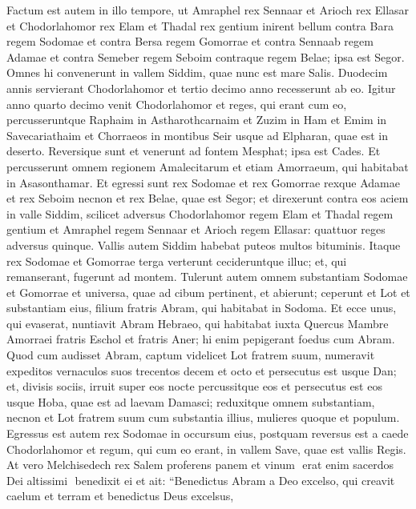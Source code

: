 \begin{biblechapter}
\begin{biblechapter}
\begin{biblechapter}
\begin{biblechapter}
\begin{biblechapter}
\begin{biblechapter}
\begin{biblechapter}
\begin{biblechapter}
\begin{biblechapter}
\begin{biblechapter}
\begin{biblechapter}
\begin{biblechapter}
\begin{biblechapter}
\begin{biblechapter}
\verse Factum est autem in illo tempore, ut Amraphel rex Sennaar et Arioch rex Ellasar et Chodorlahomor rex Elam et Thadal rex gentium 
\verse inirent bellum contra Bara regem Sodomae et contra Bersa regem Gomorrae et contra Sennaab regem Adamae et contra Semeber regem Seboim contraque regem Belae; ipsa est Segor.
 \verse Omnes hi convenerunt in vallem Siddim, quae nunc est mare Salis. 
\verse Duodecim annis servierant Chodorlahomor et tertio decimo anno recesserunt ab eo. 
\verse Igitur anno quarto decimo venit Chodorlahomor et reges, qui erant cum eo, percusseruntque Raphaim in Astharothcarnaim et Zuzim in Ham et Emim in Savecariathaim 
\verse et Chorraeos in montibus Seir usque ad Elpharan, quae est in deserto. 
\verse Reversique sunt et venerunt ad fontem Mesphat; ipsa est Cades. Et percusserunt omnem regionem Amalecitarum et etiam Amorraeum, qui habitabat in Asasonthamar. 
\verse Et egressi sunt rex Sodomae et rex Gomorrae rexque Adamae et rex Seboim necnon et rex Belae, quae est Segor; et direxerunt contra eos aciem in valle Siddim, 
\verse scilicet adversus Chodorlahomor regem Elam et Thadal regem gentium et Amraphel regem Sennaar et Arioch regem Ellasar: quattuor reges adversus quinque. 
\verse Vallis autem Siddim habebat puteos multos bituminis. Itaque rex Sodomae et Gomorrae terga verterunt cecideruntque illuc; et, qui remanserant, fugerunt ad montem. 
\verse Tulerunt autem omnem substantiam Sodomae et Gomorrae et universa, quae ad cibum pertinent, et abierunt; 
\verse ceperunt et Lot et substantiam eius, filium fratris Abram, qui habitabat in Sodoma.
 \verse Et ecce unus, qui evaserat, nuntiavit Abram Hebraeo, qui habitabat iuxta Quercus Mambre Amorraei fratris Eschol et fratris Aner; hi enim pepigerant foedus cum Abram. 
\verse Quod cum audisset Abram, captum videlicet Lot fratrem suum, numeravit expeditos vernaculos suos trecentos decem et octo et persecutus est usque Dan; 
\verse et, divisis sociis, irruit super eos nocte percussitque eos et persecutus est eos usque Hoba, quae est ad laevam Damasci; 
\verse reduxitque omnem substantiam, necnon et Lot fratrem suum cum substantia illius, mulieres quoque et populum.
 \verse Egressus est autem rex Sodomae in occursum eius, postquam reversus est a caede Chodorlahomor et regum, qui cum eo erant, in vallem Save, quae est vallis Regis.
 \verse At vero Melchisedech rex Salem proferens panem et vinum ­ erat enim sacerdos Dei altissimi ­ \verse benedixit ei et ait:
 “Benedictus Abram a Deo excelso, qui creavit caelum et terram 
\verse et benedictus Deus excelsus,

\end{biblechapter}
\end{biblechapter}
\end{biblechapter}
\end{biblechapter}
\end{biblechapter}
\end{biblechapter}
\end{biblechapter}
\end{biblechapter}
\end{biblechapter}
\end{biblechapter}
\end{biblechapter}
\end{biblechapter}
\end{biblechapter}
\end{biblechapter}
